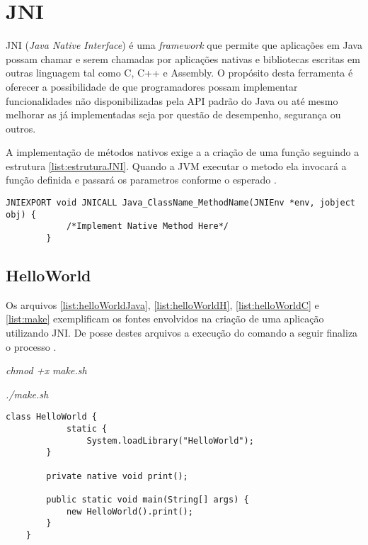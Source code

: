 \chapter{JNI}
\label{apend:jni}

JNI (\textit{Java Native Interface}) é uma \textit{framework} que permite que
aplicações em Java possam chamar e serem chamadas por aplicações nativas e
bibliotecas escritas em outras linguagem tal como C, C++ e Assembly.
O propósito desta ferramenta é oferecer a possibilidade de que programadores
possam implementar funcionalidades não disponibilizadas pela API padrão do Java
ou até mesmo melhorar as já implementadas seja por questão de desempenho,
segurança ou outros.

A implementação de métodos nativos exige a a criação de uma função seguindo a estrutura
\ref{list:estruturaJNI}. Quando a JVM executar o metodo ela invocará a função
definida e passará os parametros conforme o esperado \cite{jniDoc}. 

	\begin{lstlisting}[caption=HelloWorld.java., label=list:estruturaJNI]	
		JNIEXPORT void JNICALL Java_ClassName_MethodName(JNIEnv *env, jobject obj) {
			/*Implement Native Method Here*/
		}
	\end{lstlisting}
	
\section{HelloWorld}

	Os arquivos \ref{list:helloWorldJava}, \ref{list:helloWorldH},
	\ref{list:helloWorldC} e \ref{list:make} exemplificam os fontes envolvidos na criação de uma aplicação utilizando JNI. De posse destes arquivos a execução do comando a seguir finaliza o processo \cite{jniDoc}.

	
	\textit{chmod +x make.sh}
	
	\textit{./make.sh}


	\begin{lstlisting}[caption=HelloWorld.java., label=list:helloWorldJava]
	class HelloWorld {
			static {
				System.loadLibrary("HelloWorld");
	    }
	    
	    private native void print();
	        
	    public static void main(String[] args) {
	    	new HelloWorld().print();
	    }   
	}
	\end{lstlisting}
	
